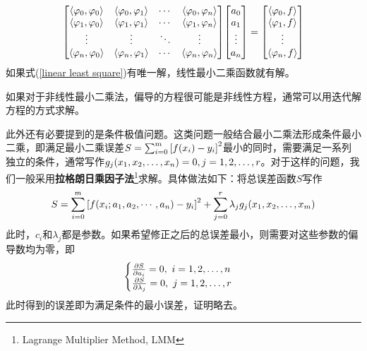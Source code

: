 \documentclass[12pt,a4paper,openany,twoside]{book}
\numberwithin{equation}{section}
\newcommand{\mean}[1]{\left\langle #1 \right\rangle}
\begin{document}
          \begin{equation}
            \mqty[
              \mean{\varphi_0,\varphi_0}&\mean{\varphi_0,\varphi_1}&\cdots&\mean{\varphi_0,\varphi_n}\\
              \mean{\varphi_1,\varphi_0}&\mean{\varphi_1,\varphi_1}&\cdots&\mean{\varphi_1,\varphi_n}\\
              \vdots&\vdots&\ddots&\vdots\\
              \mean{\varphi_n,\varphi_0}&\mean{\varphi_n,\varphi_1}&\cdots&\mean{\varphi_n,\varphi_n}
            ]\mqty[
              a_0\\
              a_1\\
              \vdots\\
              a_n
            ]=\mqty[
              \mean{\varphi_0,f}\\
              \mean{\varphi_1,f}\\
              \vdots\\
              \mean{\varphi_n,f}
            ]
            \label{linear least square}
          \end{equation}
          如果式(\ref{linear least square})有唯一解，线性最小二乘函数就有解。

          如果对于非线性最小二乘法，偏导的方程很可能是非线性方程，通常可以用迭代解方程的方式求解。

          此外还有必要提到的是条件极值问题。这类问题一般结合最小二乘法形成条件最小二乘，即满足最小二乘误差$S=\sum_{i=0}^m{\qty[f\qty(x_i)-y_i]^2}$最小的同时，需要满足一系列独立的条件，通常写作$g_j\qty(x_1,x_2,\dots,x_n)=0,j=1,2,\dots,r$。对于这样的问题，我们一般采用\textbf{拉格朗日乘因子法}\footnote{Lagrange Multiplier Method, LMM}求解。具体做法如下：将总误差函数$S$写作
          \begin{equation}
            S=\sum_{i=0}^m{\qty[f\qty(x_i;a_1,a_2,\cdots,a_n)-y_i]^2}+\sum_{j=0}^r{\lambda_j g_j\qty(x_1,x_2,\dots,x_m)}
          \end{equation}
          此时，$c_i$和$\lambda_j$都是参数。如果希望修正之后的总误差最小，则需要对这些参数的偏导数均为零，即
          \begin{equation}
            \begin{cases}
              \pdv{S}{a_i}=0,\ i=1,2,\dots,n\\
              \pdv{S}{\lambda_j}=0,\ j=1,2,\dots,r
            \end{cases}
          \end{equation}
          此时得到的误差即为满足条件的最小误差，证明略去。
\end{document}

